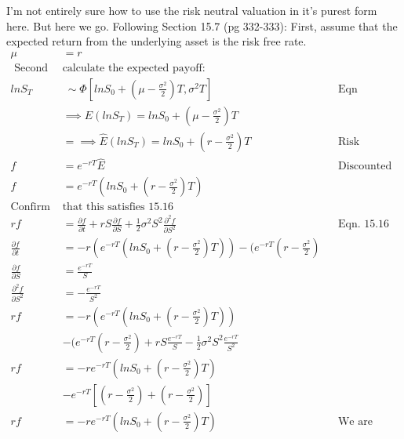 \documentclass[12pt]{article}
\newenvironment{problem}[3][Problem]{\begin{trivlist}
\item[\hskip \labelsep {\bfseries #1}\hskip \labelsep {\bfseries #2.}]}{\end{trivlist}}
\begin{document}
\newpage
\begin{problem}{15.11}. I\rq{}m not entirely sure how to use the risk neutral valuation in it\rq{}s purest form here. But here we go. Following Section 15.7 (pg 332-333): First, assume that the expected return from the underlying asset is the risk free rate. 
\begin{align*}
\mu &= r \\
\text{ Second  } & \text{calculate the expected payoff: } \\
ln S_T &~\sim \Phi [ ln S_0 + (\mu - \frac{\sigma^2}{2})T, \sigma^2T] && \text{Eqn 14.19/15.3 (pg 313/320)} \\ 
&\implies  E(ln S_T) = ln S_0 + (\mu - \frac{\sigma^2}{2})T \\
&= \implies \hat{E}(ln S_T) = ln S_0 + (r - \frac{\sigma^2}{2})T && \text{Risk Neutral} \\
f &= e^{-rT}\hat{E} && \text{Discounted to today} \\
f&= e^{-rT}( ln S_0 + (r - \frac{\sigma^2}{2})T) \\ 
\text{Confirm  }& \text{that this satisfies 15.16} \\
rf &= \frac{\partial f}{\partial t} + rS\frac{\partial f}{\partial S} + \frac{1}{2} \sigma^2 S^2\frac{\partial^2 f}{\partial S^2} && \text{Eqn. 15.16 (pg 330)} \\
\frac{\partial f}{\partial t} &= -r( e^{-rT}( ln S_0 + (r - \frac{\sigma^2}{2})T)) - (e^{-rT}(r-\frac{\sigma^2}{2}) \\
\frac{\partial f}{\partial S} &= \frac{e^{-rT}}{S} \\
\frac{\partial^2 f}{\partial S^2} &= -\frac{e^{-rT}}{S^2} \\
rf &= -r( e^{-rT}( ln S_0 + (r - \frac{\sigma^2}{2})T)) \\
   &- (e^{-rT}(r-\frac{\sigma^2}{2}) + rS\frac{e^{-rT}}{S} - \frac{1}{2} \sigma^2 S^2 \frac{e^{-rT}}{S^2}\\
rf &= -r e^{-rT}( ln S_0 + (r - \frac{\sigma^2}{2})T) \\
   &- e^{-rT}[(r-\frac{\sigma^2}{2}) + (r - \frac{ \sigma^2}{2})]\\
rf &= -r e^{-rT}( ln S_0 + (r - \frac{\sigma^2}{2})T) && \text{We are satisfied}\\
\end{align*}
\end{problem}
\end{document}
